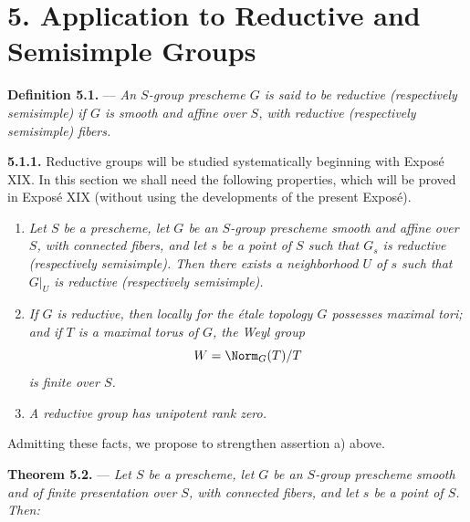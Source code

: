 

%
\section*{5. Application to Reductive and Semisimple Groups}

\noindent{}%
\textbf{Definition 5.1.} --- \textit{An \(S\)-group prescheme
\(G\) is said to be \emph{reductive} (respectively
\emph{semisimple}) if \(G\) is smooth and affine over \(S\), with
reductive (respectively semisimple) fibers.}

\medskip
\noindent{}%
\textbf{5.1.1.}
Reductive groups will be studied systematically beginning with
Exposé XIX. In this section we shall need the following
properties, which will be proved in Exposé XIX (without using the
developments of the present Exposé).

\begin{enumerate}
\renewcommand{\labelenumi}{\textit{\alph{enumi})}}
\item \textit{Let \(S\) be a prescheme, let \(G\) be an
\(S\)-group prescheme smooth and affine over \(S\), with connected
fibers, and let \(s\) be a point of \(S\) such that \(G_s\) is
reductive (respectively semisimple). Then there exists a
neighborhood \(U\) of \(s\) such that \(G|_U\) is reductive
(respectively semisimple).}

\item \textit{If \(G\) is reductive, then locally for the étale
topology \(G\) possesses maximal tori; and if \(T\) is a maximal
torus of \(G\), the Weyl group}
\[
  W=\Norm_G(T)/T
\]
\textit{is finite over \(S\).}

\item \textit{A reductive group has unipotent rank zero.}
\end{enumerate}

Admitting these facts, we propose to strengthen assertion a)
above.

\medskip
\noindent{}%
\textbf{Theorem 5.2.} --- \textit{Let \(S\) be a prescheme, let
\(G\) be an \(S\)-group prescheme smooth and of finite
presentation over \(S\), with connected fibers, and let \(s\) be
a point of \(S\). Then:}

